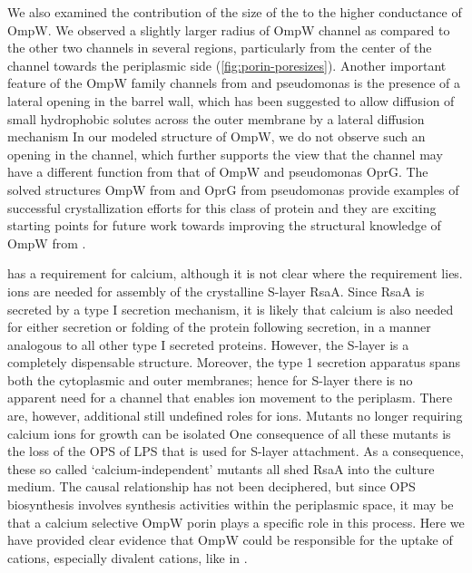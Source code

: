 We also examined the contribution of the size of the to the higher conductance
of \caulobacter OmpW. We observed a slightly larger radius of \caulobacter OmpW
channel as compared to the other two channels in several regions, particularly
from the center of the channel towards the periplasmic side
(\cref{fig:porin-poresizes}). Another important feature of the OmpW family
channels from \ecoli and \ac{pseudomonas} is the presence of a lateral opening
in the barrel wall, which has been suggested to allow diffusion of small hydrophobic solutes across the outer membrane by a lateral diffusion mechanism In our modeled structure of \caulobacter OmpW, we do not observe such an opening in the channel, which further supports the view that the \caulobacter channel may have a different function from that of \ecoli OmpW and \ac{pseudomonas} OprG. The solved structures OmpW from \ecoli and OprG from \ac{pseudomonas} provide examples of  successful crystallization efforts for this class of protein and they are exciting starting points for future work towards improving the structural knowledge of OmpW from \caulobacter.

\caulobacter has a requirement for calcium, although it is not clear where the requirement lies.  ions are needed for assembly of the crystalline \ac{S-layer} RsaA. Since RsaA is secreted by a type I secretion mechanism, it is likely that calcium is also needed for either secretion or folding of the protein following secretion, in a manner analogous to all other type I secreted proteins.  However, the \ac{S-layer} is a completely dispensable structure. Moreover, the type 1 secretion apparatus spans both the cytoplasmic and outer membranes; hence for \ac{S-layer} there is no apparent need for a channel that enables  ion movement to the periplasm. There are, however, additional still undefined roles for  ions. Mutants no longer requiring calcium ions for growth can be isolated One consequence of all these mutants is the loss of the \ac{OPS} of \ac{LPS} that is used for \ac{S-layer} attachment. As a consequence, these so called `calcium-independent' mutants all shed RsaA into the culture medium. The causal relationship has not been deciphered, but since \ac{OPS} biosynthesis involves synthesis activities within the periplasmic space, it may be that a calcium selective OmpW porin plays a specific role in this process. Here we have provided clear evidence that OmpW could be responsible for the uptake of cations, especially divalent cations, like  in \caulobacter. 
